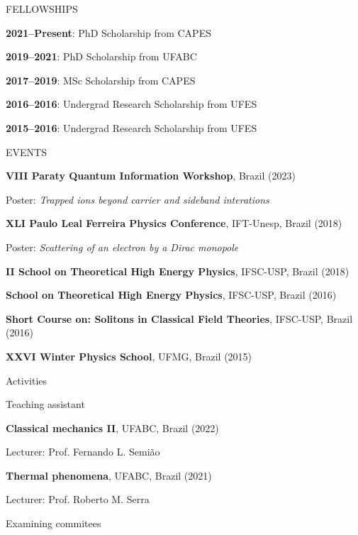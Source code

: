 \documentclass[11pt]{article}
\renewcommand{\Large}{\fontsize{14}{16}\selectfont}
\renewcommand{\large}{\fontsize{12}{14}\selectfont}
\newcommand{\linesep}{\vspace*{1em}}
\newcommand{\MySection}[1]{
    \vspace*{2em}
    {\color{Indigo} \Large \textsf{\uppercase{#1}} \hrulefill} \par
    \vspace*{1em}
}
\newcommand{\MySubSec}[1]{
    \vspace*{0.25em}
    {\color{Indigo} \large \textsf{#1}} \par
    \vspace*{0.25em}
}
\newcommand{\GrantItem}[2]{
    \textbf{#1}: #2 \par
}
\newcommand{\EventItem}[4]{
    \textbf{#1}, #2 (#3) \par
    {\small #4} \par
}
\newcommand{\ActivItem}[3]{
    {\small
    \quad \textbf{#1}, #2 \par
    \quad #3} \par
}
\begin{document}
\MySection{Fellowships}

\GrantItem{2021--Present}{PhD Scholarship from CAPES}

\GrantItem{2019--2021}{PhD Scholarship from UFABC}

\GrantItem{2017--2019}{MSc Scholarship from CAPES}

\GrantItem{2016--2016}{Undergrad Research Scholarship from UFES}

\GrantItem{2015--2016}{Undergrad Research Scholarship from UFES}

\MySection{Events}

\EventItem{VIII Paraty Quantum Information Workshop}
{Brazil}
{2023}
{\quad Poster: \emph{Trapped ions beyond carrier and sideband interations}}

\linesep

\EventItem{XLI Paulo Leal Ferreira Physics Conference}
{IFT-Unesp, Brazil}
{2018}
{\quad Poster: \emph{Scattering of an electron by a Dirac monopole}}

\linesep

\EventItem{II School on Theoretical High Energy Physics}
{IFSC-USP, Brazil}
{2018}

\linesep

\EventItem{School on Theoretical High Energy Physics}
{IFSC-USP, Brazil}
{2016}

\linesep

\EventItem{Short Course on: Solitons in Classical Field Theories}
{IFSC-USP, Brazil}
{2016}

\linesep

\EventItem{XXVI Winter Physics School}
{UFMG, Brazil}
{2015}

\MySection{Activities}

\MySubSec{Teaching assistant}

\ActivItem{Classical mechanics II}
{UFABC, Brazil (2022)}
{Lecturer: Prof. Fernando L. Semião}

\ActivItem{Thermal phenomena}
{UFABC, Brazil (2021)}
{Lecturer: Prof. Roberto M. Serra}

\linesep

\MySubSec{Examining commitees}
\end{document}

